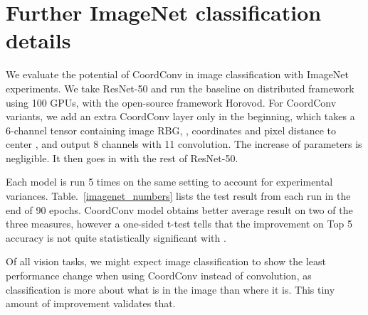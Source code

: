\documentclass{article}
\begin{document}



\section{Further ImageNet classification details}

We evaluate the potential of CoordConv in image classification with ImageNet experiments. We take ResNet-50 and run the baseline on distributed framework using 100 GPUs, with the open-source framework Horovod. For CoordConv variants, we add an extra CoordConv layer only in the beginning, which takes a 6-channel tensor containing image RBG, ,  coordinates and pixel distance to center , and output 8 channels with 11 convolution. The increase of parameters is negligible. It then goes in with the rest of ResNet-50.

Each model is run 5 times on the same setting to account for experimental variances. Table.~\ref{imagenet_numbers} lists the test result from each run in the end of 90 epochs. CoordConv model obtains better average result on two of the three measures, however a one-sided t-test tells that the improvement on Top 5 accuracy is not quite statistically significant with . 

Of all vision tasks, we might expect image classification to show the least performance change when using CoordConv instead of convolution, as classification is more about what is in the image than where it is. This tiny amount of improvement validates that.
\end{document}
